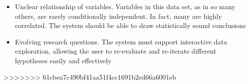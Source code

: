 \begin{itemize}
\item Unclear relationship of variables. Variables in this data
    set, as in so many others, are rarely conditionally independent.
    In fact, many are highly correlated. The system should be able to
    draw statistically sound conclusions
  \item Evolving research questions. The system must support
    interactive data exploration, allowing the user to re-evaluate and
    re-iterate different hypotheses easily and effectively

  \end{itemize}

>>>>>>> 61cbea7c490bf41aa51f4cc1691b2ed66a6001eb
